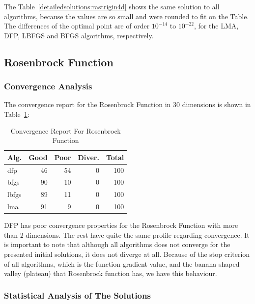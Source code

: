 \documentclass[conference]{IEEEtran}
\begin{document}
The Table~\ref{detailedsolutions:rastrigin4d} shows the same solution to all algorithms, because the values are so small
and were rounded to fit on the Table. The differences of the optimal point are of order $10^{-14}$ to $10^{-22}$,
for the LMA, DFP, LBFGS and BFGS algorithms, respectively.

\subsection{Rosenbrock Function}
\label{rosenbrock4d4D}

\subsubsection{Convergence Analysis}
\label{convergencerosenbrock4d4D}


The convergence report for the Rosenbrock Function in 30 dimensions is shown in Table~\ref{convergence:rosenbrock4d}:

\begin{table}[H]
\centering
\caption{Convergence Report For Rosenbrock Function}
\label{convergence:rosenbrock4d}
\begin{tabular}{lrrrr}
\toprule
 Alg. &  Good &  Poor &  Diver. &  Total \\
\midrule
  dfp &    46 &    54 &       0 &    100 \\
 bfgs &    90 &    10 &       0 &    100 \\
lbfgs &    89 &    11 &       0 &    100 \\
  lma &    91 &     9 &       0 &    100 \\
\bottomrule
\end{tabular}
\end{table}

DFP has poor convergence properties for the Rosenbrock Function with more than 2 dimensions.
The rest have quite the same profile regarding convergence. It is important to note that
although all algorithms does not converge for the presented initial solutions, it does not
diverge at all. Because of the stop criterion of all algorithms, which is the function gradient value,
and the banana shaped valley (plateau) that Rosenbrock function has, we have this behaviour.
\subsubsection{Statistical Analysis of The Solutions}
\label{statisticalanalysisrosenbrock4d4D}
\end{document}
